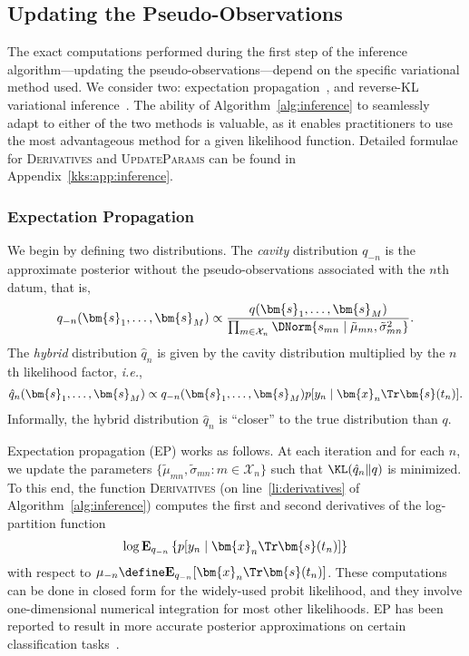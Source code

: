 \subsection{Updating the Pseudo-Observations}
\label{kks:sec:inf-pseudo-obs}

The exact computations performed during the first step of the inference algorithm---updating the pseudo-observations---depend on the specific variational method used.
We consider two: expectation propagation~\citep{minka2001family}, and reverse-KL variational inference~\citep{blei2017variational}.
The ability of Algorithm~\ref{alg:inference} to seamlessly adapt to either of the two methods is valuable, as it enables practitioners to use the most advantageous method for a given likelihood function.
Detailed formulae for \textsc{Derivatives} and \textsc{UpdateParams} can be found in Appendix~\ref{kks:app:inference}.

\subsubsection{Expectation Propagation}

We begin by defining two distributions.
The \emph{cavity} distribution $q_{-n}$ is the approximate posterior without the pseudo-observations associated with the $n$th datum, that is,
\begin{align*}
	q_{-n}(\bm{s}_1, \ldots, \bm{s}_M) \propto \frac{q(\bm{s}_1, \ldots, \bm{s}_M)}{
	\prod_{m \in \mathcal{X}_n} \DNorm{s_{mn} \mid \tilde{\mu}_{mn}, \tilde{\sigma}^2_{mn}}}.
\end{align*}
The \emph{hybrid} distribution $\hat{q}_n$ is given by the cavity distribution multiplied by the $n$th likelihood factor, \textit{i.e.},
\begin{align*}
	\hat{q}_n(\bm{s}_1, \ldots, \bm{s}_M) \propto q_{-n}(\bm{s}_1, \ldots, \bm{s}_M) p[y_n \mid \bm{x}_n\Tr \bm{s}(t_n)].
\end{align*}
Informally, the hybrid distribution $\hat{q}_n$ is ``closer'' to the true distribution than $q$.

Expectation propagation (EP) works as follows. At each iteration and for each $n$, we update the parameters $\{ \tilde{\mu}_{mn}, \tilde{\sigma}_{mn} : m \in \mathcal{X}_n \}$ such that $\KL( \hat{q}_n \Vert q )$ is minimized.
To this end, the function \textsc{Derivatives} (on line~\ref{li:derivatives} of Algorithm~\ref{alg:inference}) computes the first and second derivatives of the log-partition function
\begin{align}
	\label{kks:eq:logpart}
	\log \mathbf{E}_{q_{-n}} \left\{ p[y_n \mid \bm{x}_n\Tr \bm{s}(t_n)] \right\}
\end{align}
with respect to ${\mu}_{-n} \define \mathbf{E}_{q_{-n}}[\bm{x}_n\Tr \bm{s}(t_n)]$.
These computations can be done in closed form for the widely-used probit likelihood, and they involve one-dimensional numerical integration for most other likelihoods.
EP has been reported to result in more accurate posterior approximations on certain classification tasks~\citep{nickisch2008approximations}.

